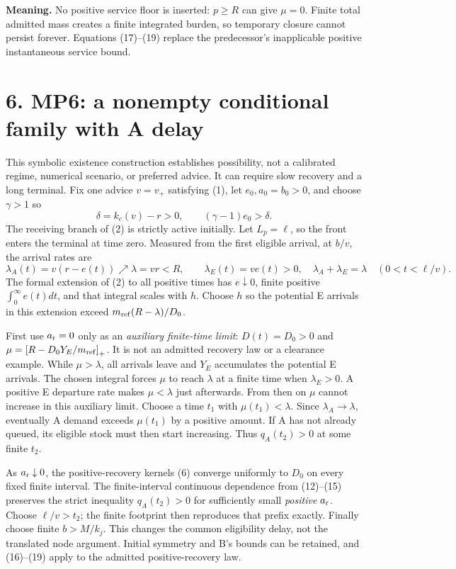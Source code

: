 \documentclass[11pt,a4paper]{article}
\newcommand{\pos}[1]{\left[#1\right]_+}
\begin{document}
\textbf{Meaning.} No positive service floor is inserted: $p\geq R$ can
give $\mu=0$. Finite total admitted mass creates a finite integrated burden,
so temporary closure cannot persist forever. Equations (17)--(19) replace
the predecessor's inapplicable positive instantaneous service bound.

\newpage
\section*{6. MP6: a nonempty conditional family with A delay}

This symbolic existence construction establishes possibility, not a
calibrated regime, numerical scenario, or preferred advice. It can require
slow recovery and a long terminal. Fix one advice $v=v_+$ satisfying (1),
let $e_0,a_0=b_0>0$, and choose $\gamma>1$ so
\begin{equation}
 \delta=k_c(v)-r>0,\qquad (\gamma-1)e_0>\delta.
 \tag{20}
\end{equation}
The receiving branch of (2) is strictly active initially. Let $L_p=\ell$,
so the front enters the terminal at time zero. Measured from the first
eligible arrival, at $b/v$, the arrival rates are
\begin{equation}
 \lambda_A(t)=v(r-e(t))\nearrow\lambda=vr<R,\qquad
 \lambda_E(t)=ve(t)>0,\quad \lambda_A+\lambda_E=\lambda
 \quad (0<t<\ell/v).
 \tag{21}
\end{equation}
The formal extension of (2) to all positive times has $e\downarrow0$,
finite positive $\int_0^\infty e(t)dt$, and that integral scales with $h$.
Choose $h$ so the potential E arrivals in this extension exceed
$m_{\rm ref}(R-\lambda)/D_0$.

First use $a_{\rm r}=0$ only as an \emph{auxiliary finite-time limit}:
$D(t)=D_0>0$ and $\mu=\pos{R-D_0Y_E/m_{\rm ref}}$. It is not an
admitted recovery law or a clearance example. While $\mu>\lambda$, all
arrivals leave and $Y_E$ accumulates the potential E arrivals. The chosen
integral forces $\mu$ to reach $\lambda$ at a finite time when
$\lambda_E>0$. A positive E departure rate makes $\mu<\lambda$ just
afterwards. From then on $\mu$ cannot increase in this auxiliary limit.
Choose a time $t_1$ with $\mu(t_1)<\lambda$. Since $\lambda_A\to\lambda$,
eventually A demand exceeds $\mu(t_1)$ by a positive amount. If A has not
already queued, its eligible stock must then start increasing. Thus
$q_A(t_2)>0$ at some finite $t_2$.

As $a_{\rm r}\downarrow0$, the positive-recovery kernels (6) converge
uniformly to $D_0$ on every fixed finite interval. The finite-interval
continuous dependence from (12)--(15) preserves the strict inequality
$q_A(t_2)>0$ for sufficiently small \emph{positive} $a_{\rm r}$. Choose
$\ell/v>t_2$; the finite footprint then reproduces that prefix exactly.
Finally choose finite $b>M/k_j$. This changes the common eligibility delay,
not the translated node argument. Initial symmetry and B's bounds can be
retained, and (16)--(19) apply to the admitted positive-recovery law.
\end{document}
